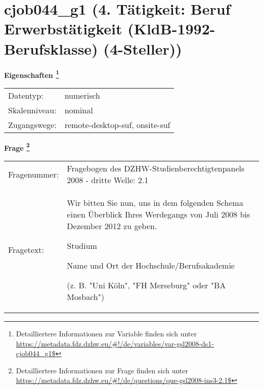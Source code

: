 
    \setcounter{footnote}{0}

    \vspace*{-1.8cm}
	\section{cjob044\_g1 (4. Tätigkeit: Beruf Erwerbstätigkeit (KldB-1992-Berufsklasse) (4-Steller))}
	\label{section:cjob044_g1}



    \vspace*{0.5cm}
    \noindent\textbf{Eigenschaften
	\footnote{Detailliertere Informationen zur Variable finden sich unter
		\url{https://metadata.fdz.dzhw.eu/\#!/de/variables/var-gsl2008-ds1-cjob044_g1$}}}\\
	\begin{tabularx}{\hsize}{@{}lX}
	Datentyp: & numerisch \\
	Skalenniveau: & nominal \\
	Zugangswege: &
	  remote-desktop-suf, 
	  onsite-suf
 \\
    \end{tabularx}



				\vspace*{0.5cm}
                \noindent\textbf{Frage
	                \footnote{Detailliertere Informationen zur Frage finden sich unter
		              \url{https://metadata.fdz.dzhw.eu/\#!/de/questions/que-gsl2008-ins3-2.1$}}}\\
				\begin{tabularx}{\hsize}{@{}lX}
					Fragenummer: &
					  Fragebogen des DZHW-Studienberechtigtenpanels 2008 - dritte Welle:
					  2.1
 \\
					Fragetext: & Wir bitten Sie nun, uns in dem folgenden Schema einen Überblick Ihres Werdegangs von Juli 2008 bis Dezember 2012 zu geben.\par  Studium\par  Name und Ort der Hochschule/Berufsakademie\par  (z. B. "Uni Köln", "FH Merseburg" oder "BA Mosbach") \\
				\end{tabularx}





